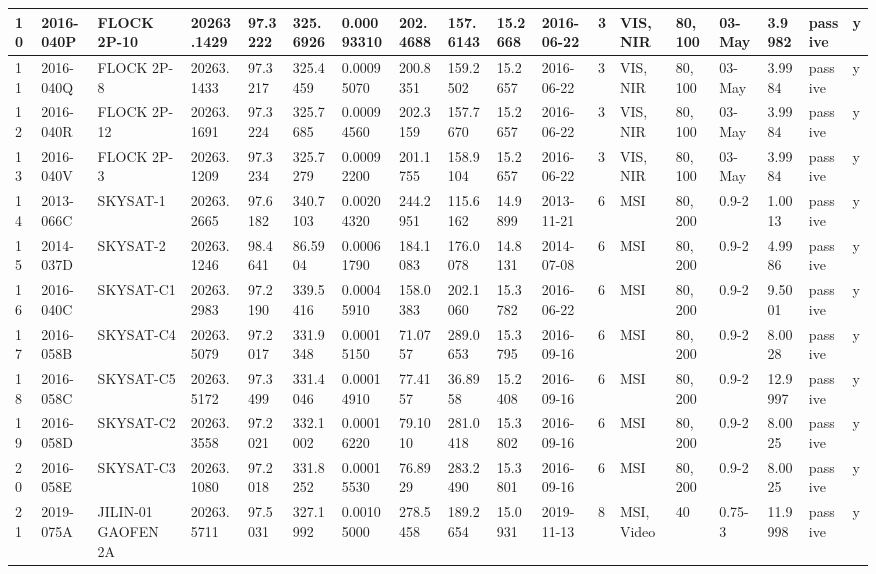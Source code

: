 \documentclass[12pt,a4paper,notitlepage,twoside,openright]{report}
\begin{document}
\begin{longtable}{|l|l|l|l|l|l|l|l|l|l|l|l|l|l|l|l|l|l|}
        10 & 2016-040P & FLOCK 2P-10 & 20263.1429 & 97.3222 & 325.6926 & 0.00093310 & 202.4688 & 157.6143 & 15.2668 & 2016-06-22 & 3 & VIS, NIR & 80, 100 & 03-May & 3.9982 & passive & y \\ \hline
        11 & 2016-040Q & FLOCK 2P-8 & 20263.1433 & 97.3217 & 325.4459 & 0.00095070 & 200.8351 & 159.2502 & 15.2657 & 2016-06-22 & 3 & VIS, NIR & 80, 100 & 03-May & 3.9984 & passive & y \\ \hline
        12 & 2016-040R & FLOCK 2P-12 & 20263.1691 & 97.3224 & 325.7685 & 0.00094560 & 202.3159 & 157.7670 & 15.2657 & 2016-06-22 & 3 & VIS, NIR & 80, 100 & 03-May & 3.9984 & passive & y \\ \hline
        13 & 2016-040V & FLOCK 2P-3 & 20263.1209 & 97.3234 & 325.7279 & 0.00092200 & 201.1755 & 158.9104 & 15.2657 & 2016-06-22 & 3 & VIS, NIR & 80, 100 & 03-May & 3.9984 & passive & y \\ \hline
        14 & 2013-066C & SKYSAT-1 & 20263.2665 & 97.6182 & 340.7103 & 0.00204320 & 244.2951 & 115.6162 & 14.9899 & 2013-11-21 & 6 & MSI & 80, 200 & 0.9-2 & 1.0013 & passive & y \\ \hline
        15 & 2014-037D & SKYSAT-2 & 20263.1246 & 98.4641 & 86.5904 & 0.00061790 & 184.1083 & 176.0078 & 14.8131 & 2014-07-08 & 6 & MSI & 80, 200 & 0.9-2 & 4.9986 & passive & y \\ \hline
        16 & 2016-040C & SKYSAT-C1 & 20263.2983 & 97.2190 & 339.5416 & 0.00045910 & 158.0383 & 202.1060 & 15.3782 & 2016-06-22 & 6 & MSI & 80, 200 & 0.9-2 & 9.5001 & passive & y \\ \hline
        17 & 2016-058B & SKYSAT-C4 & 20263.5079 & 97.2017 & 331.9348 & 0.00015150 & 71.0757 & 289.0653 & 15.3795 & 2016-09-16 & 6 & MSI & 80, 200 & 0.9-2 & 8.0028 & passive & y \\ \hline
        18 & 2016-058C & SKYSAT-C5 & 20263.5172 & 97.3499 & 331.4046 & 0.00014910 & 77.4157 & 36.8958 & 15.2408 & 2016-09-16 & 6 & MSI & 80, 200 & 0.9-2 & 12.9997 & passive & y \\ \hline
        19 & 2016-058D & SKYSAT-C2 & 20263.3558 & 97.2021 & 332.1002 & 0.00016220 & 79.1010 & 281.0418 & 15.3802 & 2016-09-16 & 6 & MSI & 80, 200 & 0.9-2 & 8.0025 & passive & y \\ \hline
        20 & 2016-058E & SKYSAT-C3 & 20263.1080 & 97.2018 & 331.8252 & 0.00015530 & 76.8929 & 283.2490 & 15.3801 & 2016-09-16 & 6 & MSI & 80, 200 & 0.9-2 & 8.0025 & passive & y \\ \hline
        21 & 2019-075A & JILIN-01 GAOFEN 2A & 20263.5711 & 97.5031 & 327.1992 & 0.00105000 & 278.5458 & 189.2654 & 15.0931 & 2019-11-13 & 8 & MSI, Video & 40 & 0.75-3 & 11.9998 & passive & y \\ \hline

\end{longtable}
\end{document}
